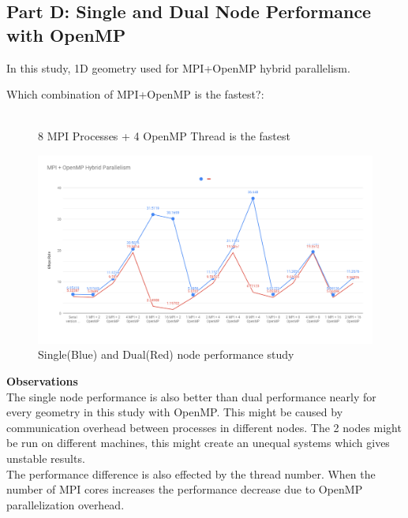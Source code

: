 \documentclass{article}
\newcommand\tab[1][0.5cm]{\hspace*{#1}}
\begin{document}
\subsection{Part D: Single and Dual Node Performance with OpenMP}
In this study, 1D geometry used for MPI+OpenMP hybrid parallelism.

\begin{description}
    \item[Which combination of MPI+OpenMP is the fastest?: ] \hfill \\ 8 MPI Processes + 4 OpenMP Thread is the fastest
\end{description}

\begin{figure}[!htb]
    \centering
    \includegraphics[width=1\linewidth]{./img/mpi+openmp.png}
    \caption{Single(Blue) and Dual(Red) node performance study}
\end{figure}  

\textbf{Observations}
\\ \tab The single node performance is also better than dual performance nearly for every geometry in this study with OpenMP. This might be caused by communication overhead between processes in different nodes. The 2 nodes might be run on different machines, this might create an unequal systems which gives unstable results.
\\ \tab The performance difference is also effected by the thread number. When the number of MPI cores increases the performance decrease due to OpenMP parallelization overhead.
\\ 
\newpage
\end{document}
